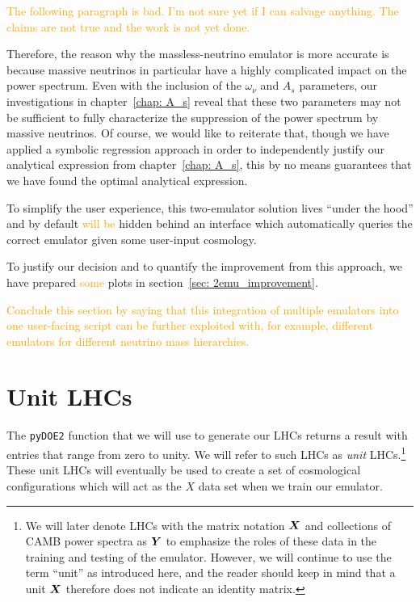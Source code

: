 \textcolor{orange}{The following paragraph is bad. I'm not sure yet if I can
salvage anything. The claims are not true and the work is not yet done.}

Therefore, the reason why the massless-neutrino emulator is more 
accurate is because massive neutrinos in particular have a highly complicated 
impact on the power spectrum. Even with the inclusion of the $\omega_\nu$ and 
$A_s$ parameters, our investigations in chapter~\ref{chap: A_s} reveal that
these two parameters may not be sufficient to fully characterize the 
suppression of the power spectrum by massive neutrinos. Of course, we would 
like to reiterate that, though we have applied a symbolic regression approach 
in order to independently justify our analytical expression from
chapter~\ref{chap: A_s}, this by no means guarantees that we have found the optimal analytical expression.

To simplify the user experience, this two-emulator solution lives ``under the
hood'' and by default \textcolor{orange}{will be} hidden behind an interface
which automatically queries the correct emulator given some user-input
cosmology.

To justify our decision and to quantify the improvement from this approach, we
have prepared \textcolor{orange}{some} plots in section~\ref{sec: 2emu_improvement}.

\textcolor{orange}{Conclude this section by saying that this integration of multiple emulators into one user-facing script can be further exploited with, for example, different emulators for different neutrino mass hierarchies.}



\section{Unit LHCs}
\label{sec: lhc_flow_chart}

The \verb|pyDOE2| function that we will use to generate our LHCs
returns a result with entries that range from zero to unity. We will refer
to such LHCs as \textit{unit} LHCs.\footnote{We will later denote LHCs with 
the matrix notation $\bm{X}$ and collections of CAMB power spectra as
$\bm{Y}$ to
emphasize the roles of these data in the training and testing of the emulator. 
However, we will continue to use the term ``unit'' as introduced here, and 
the reader should keep in mind that a unit $\bm{X}$ therefore does not
indicate an identity matrix.} These unit LHCs will eventually be used 
to create a set of cosmological configurations which will act as the $X$ data 
set when we train our emulator.

